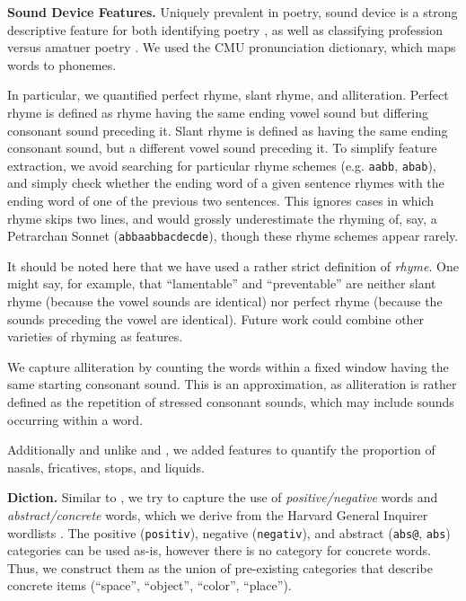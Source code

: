 \documentclass[11pt]{article}
\newcommand{\slimparagraph}[1]{
\vspace{4pt} %
\textbf{#1.}\quad}
\begin{document}
\slimparagraph{Sound Device Features}
Uniquely prevalent in poetry, sound device is a strong descriptive feature for both identifying poetry \cite{tizhoosh2008poetic}, as well as classifying profession versus amatuer poetry \cite{kao2012computational}. We used the CMU pronunciation dictionary, which maps words to phonemes.

In particular, we quantified perfect rhyme, slant rhyme, and alliteration. Perfect rhyme is defined as rhyme having the same ending vowel sound but differing consonant sound preceding it. Slant rhyme is defined as having the same ending consonant sound, but a different vowel sound preceding it. To simplify feature extraction, we avoid searching for particular rhyme schemes (e.g. {\tt aabb}, {\tt abab}), and simply check whether the ending word of a given sentence rhymes with the ending word of one of the previous two sentences. This ignores cases in which rhyme skips two lines, and would grossly underestimate the rhyming of, say, a Petrarchan Sonnet ({\tt abbaabbacdecde}), though these rhyme schemes appear rarely.

It should be noted here that we have used a rather strict definition of \emph{rhyme}. One might say, for example, that ``lamentable'' and ``preventable'' are neither slant rhyme (because the vowel sounds are identical) nor perfect rhyme (because the sounds preceding the vowel are identical). Future work could combine other varieties of rhyming as features.

We capture alliteration by counting the words within a fixed window having the same starting consonant sound. This is an approximation, as alliteration is rather defined as the repetition of stressed consonant sounds, which may include sounds occurring within a word.

Additionally and unlike  and , we added features to quantify the proportion of nasals, fricatives, stops, and liquids. 

\slimparagraph{Diction}
Similar to , we try to capture the use of \emph{positive/negative} words and \emph{abstract/concrete} words, which we derive from the Harvard General Inquirer wordlists \cite{stone1962general}. The positive (\texttt{positiv}), negative (\texttt{negativ}), and abstract (\texttt{abs@}, \texttt{abs}) categories can be used as-is, however there is no category for concrete words. Thus, we construct them as the union of pre-existing categories that describe concrete items (``space'', ``object'', ``color'', ``place'').
\end{document}

